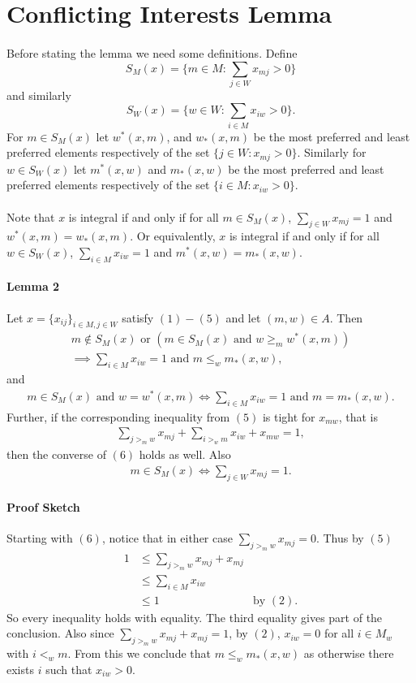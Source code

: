 \documentclass[letterpaper,12pt,oneside,onecolumn]{article}
\begin{document}
\section{Conflicting Interests Lemma}
\paragraph{}
Before stating the lemma we need some definitions. Define $$ S_M(x) = \{m\in M : \sum_{j\in W} x_{mj} > 0\}$$ and similarly $$S_W(x) = \{w\in W: \sum_{i \in M} x_{iw} > 0\}.$$ For $m \in S_M(x)$ let $w^*(x,m)$, and $w_*(x,m)$ be the most preferred and least preferred elements respectively of the set $\{ j \in W: x_{mj}>0\}$. Similarly for $w \in S_W(x)$ let $m^*(x,w)$ and $m_*(x,w)$ be the most preferred and least preferred elements respectively of the set $\{i \in M : x_{iw} > 0\}$.
\paragraph{}
Note that $x$ is integral if and only if for all $m \in S_M(x)$, $\sum_{j \in W} x_{mj}=1$ and $w^*(x,m) = w_*(x,m)$. Or equivalently, $x$ is integral if and only if for all $w \in S_W(x)$, $\sum_{i\in M} x_{iw} = 1$ and $m^*(x,w) = m_*(x,w)$.
\paragraph{Lemma 2}
Let $x = \{x_{ij}\}_{i\in M, j\in W}$ satisfy $(1) - (5)$ and let $(m,w) \in A$. Then 
\begin{align}
m\not\in S_M(x) \text{ or } (m\in S_M(x) \text{ and } w \geq_{m} w^*(x,m)) \nonumber\\\implies \sum_{i\in M} x_{iw} = 1 \text{ and } m \leq_w m_*(x,w),
\end{align}
and
\begin{align}
m\in S_M(x) \text{ and } w = w^*(x,m) \iff \sum_{i \in M} x_{iw} = 1 \text{ and } m = m_*(x,w).
\end{align}
Further, if the corresponding inequality from $(5)$ is tight for $x_{mw}$, that is 
\begin{align}
\sum_{j >_m w} x_{mj} + \sum_{i >_w m} x_{iw} + x_{mw} = 1,
\end{align}
then the converse of $(6)$ holds as well. Also 
\begin{align*}
m \in S_M(x) \iff \sum_{j \in W} x_{mj} = 1.
\end{align*}
\paragraph{Proof Sketch}
Starting with $(6)$, notice that in either case $\sum_{j >_m w} x_{mj} = 0$. Thus by $(5)$
\begin{align*}
1 &\leq \sum_{j >_m w} x_{mj} + x_{mj} \\
&\leq \sum_{i \in M} x_{iw} \\
&\leq 1 &\text{by $(2)$}.
\end{align*}
So every inequality holds with equality. The third equality gives part of the conclusion. Also since $\sum_{j >_m w} x_{mj} + x_{mj}=1$, by $(2)$, $x_{iw} = 0$ for all $i \in M_w$ with $i <_w m$. From this we conclude that $m \leq_w m_*(x,w)$ as otherwise there exists $i$ such that $x_{iw} > 0$.
\end{document}

